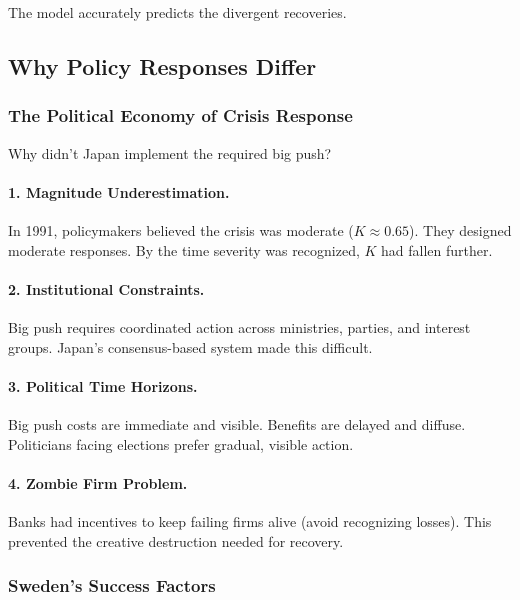 The model accurately predicts the divergent recoveries.

\subsection{Why Policy Responses Differ}

\subsubsection{The Political Economy of Crisis Response}

Why didn't Japan implement the required big push?

\paragraph{1. Magnitude Underestimation.}
In 1991, policymakers believed the crisis was moderate ($K \approx 0.65$). 
They designed moderate responses. By the time severity was recognized, 
$K$ had fallen further.

\paragraph{2. Institutional Constraints.}
Big push requires coordinated action across ministries, parties, and 
interest groups. Japan's consensus-based system made this difficult.

\paragraph{3. Political Time Horizons.}
Big push costs are immediate and visible. Benefits are delayed and diffuse. 
Politicians facing elections prefer gradual, visible action.

\paragraph{4. Zombie Firm Problem.}
Banks had incentives to keep failing firms alive (avoid recognizing losses). 
This prevented the creative destruction needed for recovery.

\subsubsection{Sweden's Success Factors}

